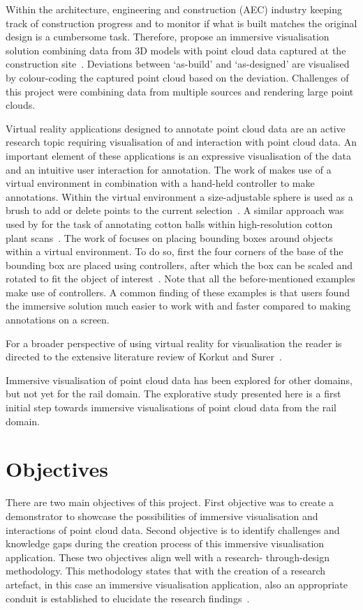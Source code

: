 Within the architecture, engineering and construction (AEC) industry keeping track of construction progress and to monitor if what is built matches the original design is a cumbersome task. Therefore, \citeauthor{Vincke19} propose an immersive visualisation solution combining data from 3D models with point cloud data captured at the construction site~\cite{Vincke19}. Deviations between `as-build' and `as-designed' are visualised by colour-coding the captured point cloud based on the deviation. Challenges of this project were combining data from multiple sources and rendering large point clouds.

Virtual reality applications designed to annotate point cloud data are an active research topic requiring visualisation of and interaction with point cloud data. An important element of these applications is an expressive visualisation of the data and an intuitive user interaction for annotation. The work of \citeauthor{garrido2021point} makes use of a virtual environment in combination with a hand-held controller to make annotations. Within the virtual environment a size-adjustable sphere is used as a brush to add or delete points to the current selection~\cite{garrido2021point}. A similar approach was used by \citeauthor{Franzluebbers22} for the task of annotating cotton balls within high-resolution cotton plant scans~\cite{Franzluebbers22}. The work of \citeauthor{Doula22} focuses on placing bounding boxes around objects within a virtual environment. To do so, first the four corners of the base of the bounding box are placed using controllers, after which the box can be scaled and rotated to fit the object of interest~\cite{Doula22}. Note that all the before-mentioned examples make use of controllers. A common finding of these examples is that users found the immersive solution much easier to work with and faster compared to making annotations on a screen.

For a broader perspective of using virtual reality for visualisation the reader is directed to the extensive literature review of Korkut and Surer~\cite{Korkut23}.

Immersive visualisation of point cloud data has been explored for other domains, but not yet for the rail domain. The explorative study presented here is a first initial step towards immersive visualisations of point cloud data from the rail domain.

\section{Objectives}
There are two main objectives of this project. First objective was to create a demonstrator to showcase the possibilities of immersive visualisation and interactions of point cloud data. Second objective is to identify challenges and knowledge gaps during the creation process of this immersive visualisation application. These two objectives align well with a research- through-design methodology. This methodology states that with the creation of a research artefact, in this case an immersive visualisation application, also an appropriate conduit is established to elucidate the research findings~\cite{Zimmerman07}.


